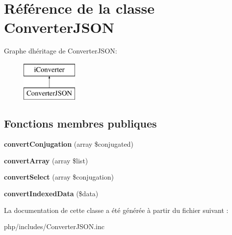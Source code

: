 \hypertarget{classConverterJSON}{}\section{Référence de la classe Converter\+J\+S\+ON}
\label{classConverterJSON}
Graphe d\textquotesingle{}héritage de Converter\+J\+S\+ON\+:\begin{figure}[H]
\begin{center}
\leavevmode
\includegraphics[height=2.000000cm]{classConverterJSON}
\end{center}
\end{figure}
\subsection*{Fonctions membres publiques}
\begin{DoxyCompactItemize}
\item 
\hypertarget{classConverterJSON_a245ad3051426af9af7cbc251642f0c90}{}\label{classConverterJSON_a245ad3051426af9af7cbc251642f0c90} 
{\bfseries convert\+Conjugation} (array \$conjugated)
\item 
\hypertarget{classConverterJSON_a3ed7ca94bfa42fdb952bcb360a7fd4ae}{}\label{classConverterJSON_a3ed7ca94bfa42fdb952bcb360a7fd4ae} 
{\bfseries convert\+Array} (array \$list)
\item 
\hypertarget{classConverterJSON_a62bbae5bb6a9aef4d648eddbe40fa16c}{}\label{classConverterJSON_a62bbae5bb6a9aef4d648eddbe40fa16c} 
{\bfseries convert\+Select} (array \$conjugation)
\item 
\hypertarget{classConverterJSON_a005d755a0798196fb1ec12e374b695c0}{}\label{classConverterJSON_a005d755a0798196fb1ec12e374b695c0} 
{\bfseries convert\+Indexed\+Data} (\$data)
\end{DoxyCompactItemize}


La documentation de cette classe a été générée à partir du fichier suivant \+:\begin{DoxyCompactItemize}
\item 
php/includes/Converter\+J\+S\+O\+N.\+inc\end{DoxyCompactItemize}
